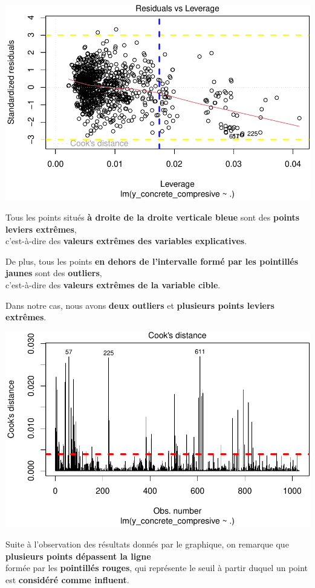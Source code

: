 \documentclass[
  12pt,
]{article}
\begin{document}
\includegraphics{rmd_final_files/figure-latex/unnamed-chunk-28-1.pdf}

Tous les points situés \textbf{à droite de la droite verticale bleue}
sont des \textbf{points leviers extrêmes},\\
c'est-à-dire des \textbf{valeurs extrêmes des variables explicatives}.

De plus, tous les points \textbf{en dehors de l'intervalle formé par les
pointillés jaunes} sont des \textbf{outliers},\\
c'est-à-dire des \textbf{valeurs extrêmes de la variable cible}.

Dans notre cas, nous avons \textbf{deux outliers} et \textbf{plusieurs
points leviers extrêmes}.

\includegraphics{rmd_final_files/figure-latex/unnamed-chunk-29-1.pdf}

Suite à l'observation des résultats donnés par le graphique, on remarque
que \textbf{plusieurs points dépassent la ligne}\\
formée par les \textbf{pointillés rouges}, qui représente le seuil à
partir duquel un point est \textbf{considéré comme influent}.
\end{document}
